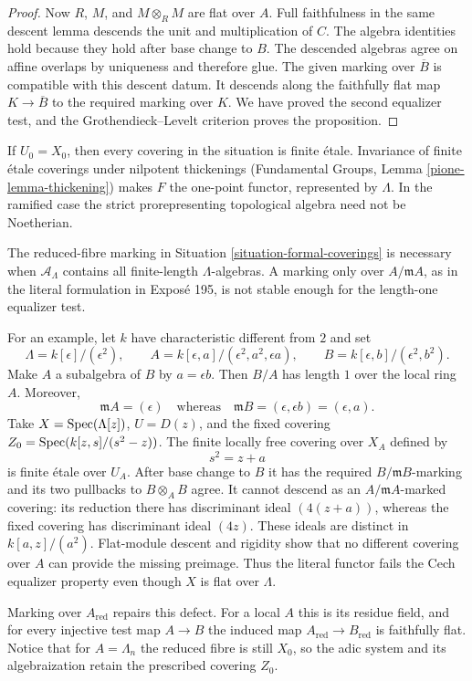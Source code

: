 \begin{proof}
Now $R$, $M$, and $M \otimes_R M$ are flat over $A$. Full faithfulness in the
same descent lemma descends the unit and multiplication of $C$. The algebra
identities hold because they hold after base change to $B$. The descended
algebras agree on affine overlaps by uniqueness and therefore glue. The
given marking over $\overline B$ is compatible with this descent datum. It
descends along the faithfully flat map $K \to \overline B$ to the required
marking over $K$. We have proved the second equalizer test, and the
Grothendieck--Levelt criterion proves the proposition.
\end{proof}

\begin{remark}
\label{remark-formal-coverings-trivial-etale}
If $U_0 = X_0$, then every covering in the situation is finite \'etale.
Invariance of finite \'etale coverings under nilpotent thickenings (Fundamental
Groups, Lemma \ref{pione-lemma-thickening}) makes $F$ the one-point functor,
represented by $\Lambda$. In the ramified case the strict prorepresenting
topological algebra need not be Noetherian.
\end{remark}

\begin{remark}
\label{remark-formal-coverings-reduced-marking}
The reduced-fibre marking in Situation
\ref{situation-formal-coverings} is necessary when
$\mathcal{A}_\Lambda$ contains all finite-length $\Lambda$-algebras. A
marking only over $A/\mathfrak mA$, as in the literal formulation in
Expos\'e 195, is not stable enough for the length-one equalizer test.

For an example, let $k$ have characteristic different from $2$ and set
$$
\Lambda=k[\epsilon]/(\epsilon^2),
\qquad
A=k[\epsilon,a]/(\epsilon^2,a^2,\epsilon a),
\qquad
B=k[\epsilon,b]/(\epsilon^2,b^2).
$$
Make $A$ a subalgebra of $B$ by $a=\epsilon b$. Then $B/A$ has length $1$
over the local ring $A$. Moreover,
$$
\mathfrak mA=(\epsilon)
\quad\text{whereas}\quad
\mathfrak mB=(\epsilon,\epsilon b)=(\epsilon,a).
$$
Take $X=\mathop{\mathrm{Spec}}(\Lambda[z])$, $U=D(z)$, and the fixed covering
$Z_0=\mathop{\mathrm{Spec}}(k[z,s]/(s^2-z))$. The finite locally free covering over $X_A$
defined by
$$
s^2=z+a
$$
is finite \'etale over $U_A$. After base change to $B$ it has the required
$B/\mathfrak mB$-marking and its two pullbacks to $B\otimes_A B$ agree. It
cannot descend as an $A/\mathfrak mA$-marked covering: its reduction there
has discriminant ideal $(4(z+a))$, whereas the fixed covering has
discriminant ideal $(4z)$. These ideals are distinct in
$k[a,z]/(a^2)$. Flat-module descent and rigidity show that no different
covering over $A$ can provide the missing preimage. Thus the literal functor
fails the Cech equalizer property even though $X$ is flat over $\Lambda$.

Marking over $A_{\mathrm{red}}$ repairs this defect. For a local $A$ this is
its residue field, and for every injective test map $A \to B$ the induced map
$A_{\mathrm{red}} \to B_{\mathrm{red}}$ is faithfully flat. Notice that for
$A=\Lambda_n$ the reduced fibre is still $X_0$, so the adic system and its
algebraization retain the prescribed covering $Z_0$.
\end{remark}

